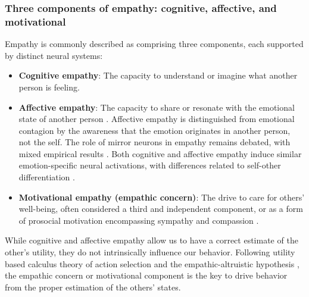 \subsubsection{Three components of empathy: cognitive, affective, and motivational}
Empathy is commonly described as comprising three components, each supported by distinct neural systems:
\begin{itemize}
	\item \textbf{Cognitive empathy}: The capacity to understand or imagine what another person is feeling.
	\item \textbf{Affective empathy}: The capacity to share or resonate with the emotional state of another person \cite{bosnjakovicEmpathyConceptsTheories2018,dewaalMammalianEmpathyBehavioural2017}. Affective empathy is distinguished from emotional contagion by the awareness that the emotion originates in another person, not the self. The role of mirror neurons in empathy remains debated, with mixed empirical results \cite{bekkaliPutativeMirrorNeuron2021,boniniMirrorNeurons302022}. Both cognitive and affective empathy induce similar emotion-specific neural activations, with differences related to self-other differentiation \cite{bernhardtNeuralBasisEmpathy2012,dvashTheoryMindEmpathy2014}.
	\item \textbf{Motivational empathy (empathic concern)}: The drive to care for others’ well-being, often considered a third and independent component, or as a form of prosocial motivation encompassing sympathy and compassion \cite{dewaalMammalianEmpathyBehavioural2017,decetyEmergenceEmpathyDevelopmental2021}.
\end{itemize}

While cognitive and affective empathy allow us to have a correct estimate of the other’s utility, they do not intrinsically influence our behavior. Following utility based calculus theory of action selection and the empathic-altruistic hypothesis \cite{Batson01041991,batson2022empathy}, the empathic concern or motivational component is the key to drive behavior from the proper estimation of the others’ states.



